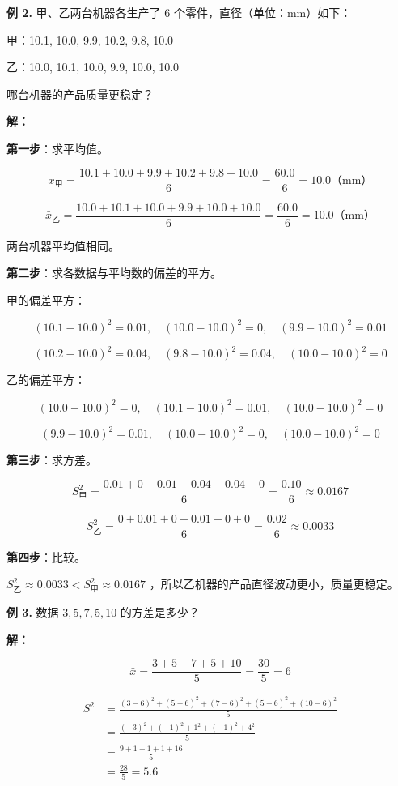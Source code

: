 \begin{workedexamples}


\textbf{例 2.} 甲、乙两台机器各生产了 6 个零件，直径（单位：mm）如下：

甲：10.1, 10.0, 9.9, 10.2, 9.8, 10.0

乙：10.0, 10.1, 10.0, 9.9, 10.0, 10.0

哪台机器的产品质量更稳定？

\textbf{解：}

\textbf{第一步}：求平均值。

\[
\bar{x}_{\text{甲}} = \frac{10.1 + 10.0 + 9.9 + 10.2 + 9.8 + 10.0}{6} = \frac{60.0}{6} = 10.0 \text{（mm）}
\]


\[
\bar{x}_{\text{乙}} = \frac{10.0 + 10.1 + 10.0 + 9.9 + 10.0 + 10.0}{6} = \frac{60.0}{6} = 10.0 \text{（mm）}
\]


两台机器平均值相同。

\textbf{第二步}：求各数据与平均数的偏差的平方。

甲的偏差平方：

\[
(10.1-10.0)^2 = 0.01, \quad (10.0-10.0)^2 = 0, \quad (9.9-10.0)^2 = 0.01
\]


\[
(10.2-10.0)^2 = 0.04, \quad (9.8-10.0)^2 = 0.04, \quad (10.0-10.0)^2 = 0
\]


乙的偏差平方：

\[
(10.0-10.0)^2 = 0, \quad (10.1-10.0)^2 = 0.01, \quad (10.0-10.0)^2 = 0
\]


\[
(9.9-10.0)^2 = 0.01, \quad (10.0-10.0)^2 = 0, \quad (10.0-10.0)^2 = 0
\]


\textbf{第三步}：求方差。

\[
S^2_{\text{甲}} = \frac{0.01 + 0 + 0.01 + 0.04 + 0.04 + 0}{6} = \frac{0.10}{6} \approx 0.0167
\]


\[
S^2_{\text{乙}} = \frac{0 + 0.01 + 0 + 0.01 + 0 + 0}{6} = \frac{0.02}{6} \approx 0.0033
\]


\textbf{第四步}：比较。

$S^2_{\text{乙}} \approx 0.0033 < S^2_{\text{甲}} \approx 0.0167$ ，所以乙机器的产品直径波动更小，质量更稳定。

\textbf{例 3.} 数据 $3, 5, 7, 5, 10$ 的方差是多少？

\textbf{解：}

\[
\bar{x} = \frac{3 + 5 + 7 + 5 + 10}{5} = \frac{30}{5} = 6
\]


\[
\begin{aligned}
S^2 &= \frac{(3-6)^2 + (5-6)^2 + (7-6)^2 + (5-6)^2 + (10-6)^2}{5} \\
&= \frac{(-3)^2 + (-1)^2 + 1^2 + (-1)^2 + 4^2}{5} \\
&= \frac{9 + 1 + 1 + 1 + 16}{5} \\
&= \frac{28}{5} = 5.6
\end{aligned}
\]



\end{workedexamples}
